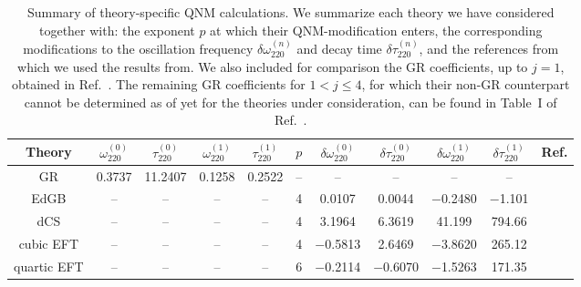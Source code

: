\documentclass[twocolumn,
               prd,
               aps,
               superscriptaddress,
               tightenlines,
               nofootinbib,
               eqsecnum,
               amsfonts,
               amsmath,
               longbibliography]{revtex4-1}
\begin{document}
\begin{table}[t]
\begin{tabular}{c | c c c c c c c c c c}
\hline
\hline
Theory      & $\omega^{(0)}_{220}$ & $\tau^{(0)}_{220}$ & $\omega^{(1)}_{220}$ & $\tau^{(1)}_{220}$ & $p$ & $\delta \omega^{(0)}_{220}$ & $\delta \tau^{(0)}_{220}$ & $\delta \omega^{(1)}_{220}$ & $\delta \tau^{(1)}_{220}$ & Ref.  \\
\hline
GR          & 0.3737               & 11.2407            &  0.1258              & 0.2522             & --  & --                          & --                        & --                          & --                        & \cite{Maselli:2019mjd} \\
\hline
EdGB        & --                   & --                 &  --                  & --                 & 4   & 0.0107                      & 0.0044                    & $-$0.2480                   & $-$1.101                  & \cite{Blazquez-Salcedo:2016enn,Pierini:2021jxd} \\
dCS         & --                   & --                 &  --                  & --                 & 4   & 3.1964                      & 6.3619                    & 41.199                      & 794.66                    & \cite{Wagle:2021tam}  \\
cubic EFT   & --                   & --                 &  --                  & --                 & 4   & $-$0.5813                   & 2.6469                    & $-$3.8620                   & 265.12                    & \cite{Cano:2021myl} \\
quartic EFT & --                   & --                 &  --                  & --                 & 6   & $-$0.2114                   & $-$0.6070                 & $-$1.5263                   & 171.35                    & \cite{Cano:2021myl}  \\
\hline
\hline
\end{tabular}
\caption{Summary of theory-specific QNM calculations.
%
We summarize each theory we have considered together with: the exponent $p$ at
which their QNM-modification enters, the corresponding modifications to the
oscillation frequency $\delta \omega^{(n)}_{220}$ and decay time $\delta \tau^{(n)}_{220}$, and the
references from which we used the results from.
%
We also included for comparison the GR coefficients, up to $j=1$, obtained in Ref.~\cite{Maselli:2019mjd}.
%
The remaining GR coefficients for $1< j \leqslant 4$, for which their non-GR counterpart cannot be determined as of yet for
the theories under consideration, can be found in Table~I of Ref.~\cite{Maselli:2019mjd}.
}
\label{tab:ref_theories_qnms}
\end{table}
\end{document}

